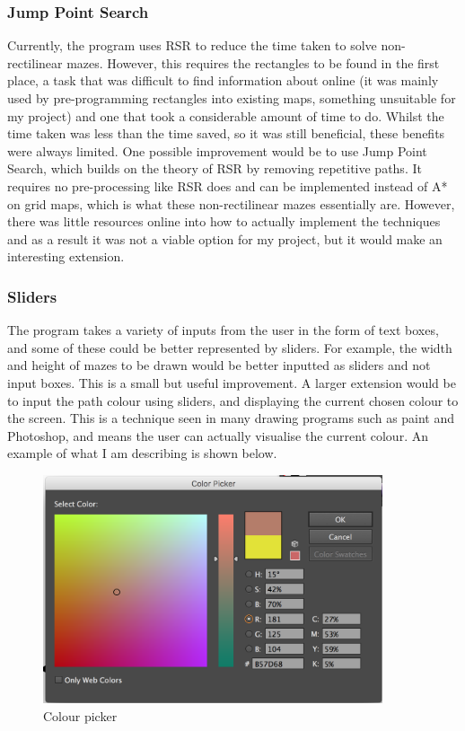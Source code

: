 \documentclass[titlepage]{article}
\begin{document}
\subsubsection{Jump Point Search}
Currently, the program uses RSR to reduce the time taken to solve non-rectilinear mazes. However, this requires the rectangles to be found in the first place, a task that was difficult to find information about online (it was mainly used by pre-programming rectangles into existing maps, something unsuitable for my project) and one that took a considerable amount of time to do. Whilst the time taken was less than the time saved, so it was still beneficial, these benefits were always limited. One possible improvement would be to use Jump Point Search, which builds on the theory of RSR by removing repetitive paths. It requires no pre-processing like RSR does and can be implemented instead of A* on grid maps, which is what these non-rectilinear mazes essentially are. However, there was little resources online into how to actually implement the techniques and as a result it was not a viable option for my project, but it would make an interesting extension.

\subsubsection{Sliders}
The program takes a variety of inputs from the user in the form of text boxes, and some of these could be better represented by sliders. For example, the width and height of mazes to be drawn would be better inputted as sliders and not input boxes. This is a small but useful improvement. A larger extension would be to input the path colour using sliders, and displaying the current chosen colour to the screen. This is a technique seen in many drawing programs such as paint and Photoshop, and means the user can actually visualise the current colour. An example of what I am describing is shown below.

\begin{figure}[H]
  \centering
  \includegraphics[width=10cm]{col.png}
  \caption{Colour picker}
  \label{fig:dijk}
\end{figure}
\end{document}

